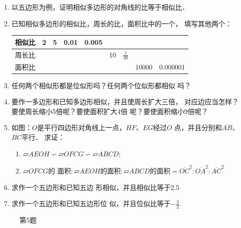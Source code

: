 \begin{ex}
\begin{enumerate}
    \item 以五边形为例，证明相似多边形的对角线的比等于相似比．
    \item 已知相似多边形的相似比，周长的比，面积比中的一个，
    填写其他两个：
\begin{center}
\begin{tabular}{c|cccccccc}
    \hline
    相似比 &    2&    5&    0.01&    0.005\\
    \hline
    周长比&&&&&    10&   $\tfrac{1}{30}$\\
    \hline
    面积比&&&&&&&    10000&    0.000001\\
    \hline
\end{tabular}
\end{center}

\item 任何两个相似形都是位似形吗？任何两个位似形都相似
吗？
\item 要作一多边形和已知多边形相似，并且使周长扩大三倍，
对应边应当怎样？要使周长缩小5倍呢？要使面积扩大4倍
呢？要使面积缩小9倍呢？
\item 如图：$O$是平行四边形对角线上一点，$HF$、$EG$经过$O$
点，并且分别和$\overline{AB}$、$\overline{BC}$平行．
求证：
\begin{enumerate}
    \item $\parallelogram{AEOH}\backsim \parallelogram OFCG \backsim \parallelogram ABCD$;
    \item $\parallelogram OFCG\text{的
面积}:\parallelogram AEOH\text{的面积}:\parallelogram ABCD\text{的面积}=\overline{OC}^2:\overline{OA}^2:\overline{AC}^2$
\end{enumerate}

\item 求作一个五边形和已知五边
形相似，并且相似比等于2.5
\item 求作一个五边形和已知五边形位
似，并且位似比等于$-\frac{3}{2}$.
\end{enumerate}
\end{ex}

\begin{figure}[htp]
    \centering
{}
    \caption*{第5题}
\end{figure}

